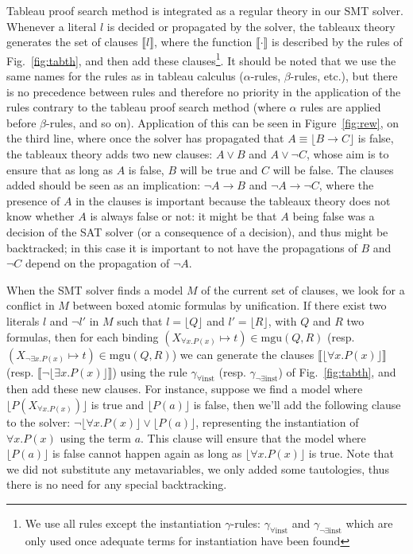 Tableau proof search method is integrated as a regular theory in our SMT solver.
Whenever a literal $l$ is decided or propagated by the solver, the tableaux
theory generates the set of clauses $\llbracket{}l\rrbracket$, where the
function $\llbracket\cdot\rrbracket$ is described by the rules of
Fig.~\ref{fig:tabth}, and then add these clauses\footnote{We use all rules
except the instantiation $\gamma$-rules: $\gamma_{\forall\mathrm{inst}}$ and
$\gamma_{\neg\exists\mathrm{inst}}$ which are only used once adequate terms
for instantiation have been found}.  It should be noted that we use the same
names for the rules as in tableau calculus ($\alpha$-rules, $\beta$-rules,
etc.), but there is no precedence between rules and therefore no priority in the
application of the rules contrary to the tableau proof search method (where
$\alpha$ rules are applied before $\beta$-rules, and so on).  Application of
this can be seen in Figure~\ref{fig:rew}, on the third line, where once the
solver has propagated that $A \equiv \lfloor B \rightarrow C \rfloor$ is false,
the tableaux theory adds two new clauses: $A \lor B$ and $A \lor \neg C$, whose
aim is to ensure that as long as $A$ is false, $B$ will be true and $C$ will be
false.  The clauses added should be seen as an implication: $\neg A \rightarrow
B$ and $\neg A \rightarrow \neg C$, where the presence of $A$ in the clauses is
important because the tableaux theory does not know whether $A$ is always false
or not: it might be that $A$ being false was a decision of the SAT solver (or a
consequence of a decision), and thus might be backtracked; in this case it is
important to not have the propagations of $B$ and $\neg C$ depend on the
propagation of $\neg A$.

When the SMT solver finds a model $M$ of the current set of clauses, we look for
a conflict in $M$ between boxed atomic formulas by unification.  If there exist
two literals $l$ and $\neg{}l'$ in $M$ such that $l=\lfloor{}Q\rfloor$ and
$l'=\lfloor{}R\rfloor$, with $Q$ and $R$ two formulas, then for each binding
$(X_{\forall{}x.P(x)}\mapsto{}t)\in\mathrm{mgu}(Q,R)$ (resp.
$(X_{\neg\exists{}x.P(x)}\mapsto{}t)\in\mathrm{mgu}(Q,R)$) we can generate the
clauses $\llbracket\lfloor\forall{}x.P(x)\rfloor{}\rrbracket$
(resp. $\llbracket\neg\lfloor\exists{}x.P(x)\rfloor{}\rrbracket$) using the rule
$\gamma_{\forall\mathrm{inst}}$ (resp. $\gamma_{\neg\exists\mathrm{inst}}$) of
Fig.~\ref{fig:tabth}, and then add these new clauses. For instance, suppose we
find a model where $\lfloor P(X_{\forall x. P(x)}) \rfloor$ is true and $\lfloor
P(a) \rfloor$ is false, then we'll add the following clause to the solver: $\neg
\lfloor \forall x. P(x) \rfloor \lor \lfloor P(a) \rfloor$, representing the
instantiation of $\forall x. P(x)$ using the term $a$. This clause will ensure
that the model where $\lfloor P(a) \rfloor$ is false cannot happen again as long
as $\lfloor \forall x. P(x) \rfloor$ is true. Note that we did not substitute
any metavariables, we only added some tautologies, thus there is no need for any
special backtracking.


